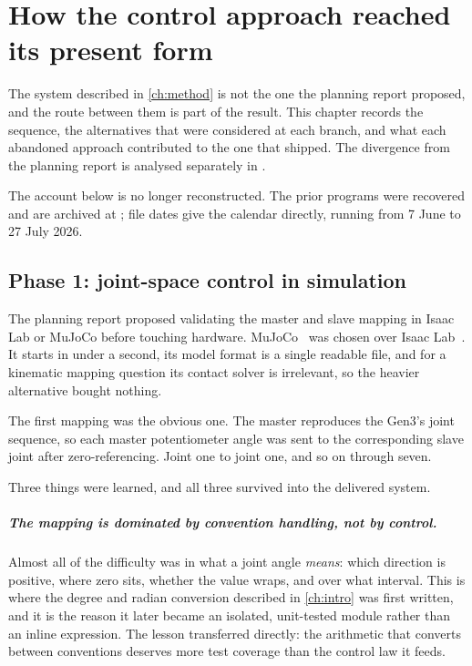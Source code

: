 \chapter{How the control approach reached its present form}
\label{ch:development}

The system described in \cref{ch:method} is not the one the planning report
proposed, and the route between them is part of the result. This chapter
records the sequence, the alternatives that were considered at each branch,
and what each abandoned approach contributed to the one that shipped. The
divergence from the planning report is analysed separately in
.

The account below is no longer reconstructed. The prior programs were
recovered and are archived at ;
file dates give the calendar directly, running from 7 June to 27 July 2026.

\section{Phase 1: joint-space control in simulation}

The planning report proposed validating the master and slave mapping in Isaac
Lab or MuJoCo before touching hardware. MuJoCo~\cite{todorov2012mujoco} was chosen over Isaac
Lab~\cite{isaaclab}. It starts in under a second, its model format
is a single readable file, and for a kinematic mapping question its contact
solver is irrelevant, so the heavier alternative bought nothing.

The first mapping was the obvious one. The master reproduces the Gen3's joint
sequence, so each master potentiometer angle was sent to the corresponding
slave joint after zero-referencing. Joint one to joint one, and so on through
seven.

Three things were learned, and all three survived into the delivered system.

\paragraph{The mapping is dominated by convention handling, not by control.}
Almost all of the difficulty was in what a joint angle \emph{means}: which
direction is positive, where zero sits, whether the value wraps, and over what
interval. This is where the degree and radian conversion described in
\cref{ch:intro} was first written, and it is the reason it later became an
isolated, unit-tested module rather than an inline expression. The lesson
transferred directly: the arithmetic that converts between conventions
deserves more test coverage than the control law it feeds.

